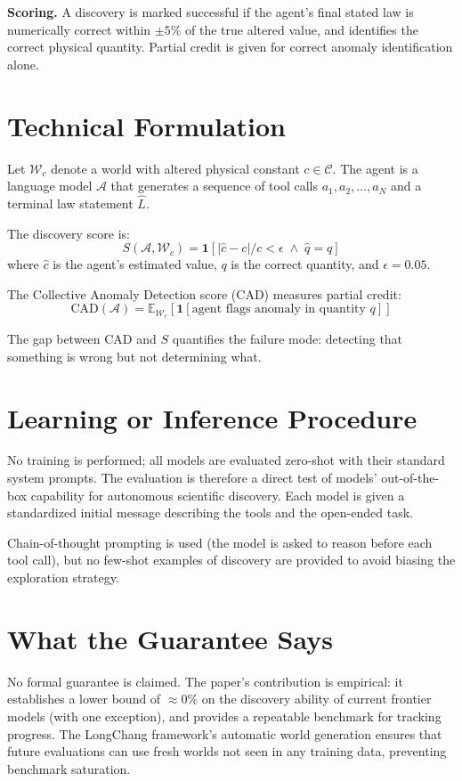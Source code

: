 \documentclass[10pt,twocolumn]{article}
\begin{document}
\textbf{Scoring.} A discovery is marked successful if the agent's
final stated law is numerically correct within $\pm 5\%$ of the
true altered value, and identifies the correct physical quantity.
Partial credit is given for correct anomaly identification alone.

\section{Technical Formulation}

Let $\mathcal{W}_c$ denote a world with altered physical constant
$c \in \mathcal{C}$. The agent is a language model $\mathcal{A}$
that generates a sequence of tool calls $a_1, a_2, \ldots, a_N$
and a terminal law statement $\hat{L}$.

The discovery score is:
\[
S(\mathcal{A}, \mathcal{W}_c) = \mathbf{1}\!\left[
  |\hat{c} - c| / c < \epsilon \;\wedge\; \hat{q} = q
\right]
\]
where $\hat{c}$ is the agent's estimated value, $q$ is the correct
quantity, and $\epsilon = 0.05$.

The Collective Anomaly Detection score (CAD) measures partial credit:
\[
\text{CAD}(\mathcal{A}) = \mathbb{E}_{\mathcal{W}_c}\!\left[
  \mathbf{1}[\text{agent flags anomaly in quantity } q]
\right]
\]

The gap between CAD and $S$ quantifies the failure mode: detecting
that something is wrong but not determining what.

\section{Learning or Inference Procedure}

No training is performed; all models are evaluated zero-shot with
their standard system prompts. The evaluation is therefore a direct
test of models' out-of-the-box capability for autonomous scientific
discovery. Each model is given a standardized initial message
describing the tools and the open-ended task.

Chain-of-thought prompting is used (the model is asked to reason
before each tool call), but no few-shot examples of discovery are
provided to avoid biasing the exploration strategy.

\section{What the Guarantee Says}

No formal guarantee is claimed. The paper's contribution is empirical:
it establishes a lower bound of $\approx$0\% on the discovery ability
of current frontier models (with one exception), and provides a
repeatable benchmark for tracking progress. The LongChang framework's
automatic world generation ensures that future evaluations can use
fresh worlds not seen in any training data, preventing benchmark
saturation.
\end{document}
